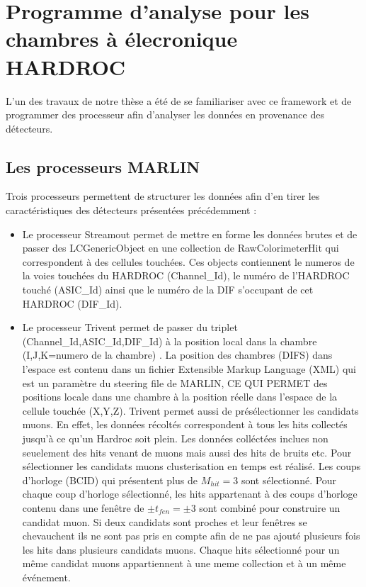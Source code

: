\section{Programme d'analyse pour les chambres à élecronique HARDROC}
L'un des travaux de notre thèse a été de se familiariser avec ce framework et de programmer des processeur afin d'analyser les données en provenance des détecteurs. 

\subsection{Les processeurs MARLIN}
Trois processeurs permettent de structurer les données afin d'en tirer les caractéristiques des détecteurs présentées précédemment :

\begin{itemize}[label=$\bullet$]
	\item Le processeur Streamout permet de mettre en forme les données brutes et de passer des LCGenericObject en une collection de RawColorimeterHit qui correspondent à des cellules touchées. Ces objects contiennent le numeros de la voies touchées du HARDROC (Channel\_Id), le numéro de l'HARDROC touché (ASIC\_Id) ainsi que le numéro de la DIF s'occupant de cet HARDROC (DIF\_Id).
	\item Le processeur Trivent permet de passer du triplet (Channel\_Id,ASIC\_Id,DIF\_Id) à la position local dans la chambre (I,J,K=numero de la chambre) . La position des chambres (DIFS) dans l'espace est contenu dans un fichier Extensible Markup Language (XML) qui est un paramètre du steering file de MARLIN, CE QUI PERMET des positions locale dans une chambre à la position réelle dans l'espace de la cellule touchée (X,Y,Z). Trivent permet aussi de présélectionner les candidats muons. En effet, les données récoltés correspondent à tous les hits collectés jusqu'à ce qu'un Hardroc soit plein. Les données colléctées inclues non seuelement des hits venant de muons mais aussi des hits de bruits etc. Pour sélectionner les candidats muons clusterisation en temps est réalisé. Les coups d'horloge (BCID) qui présentent plus de $M_{hit}=3$ sont sélectionné. Pour chaque coup d'horloge sélectionné, les hits appartenant à des coups d'horloge contenu dans une fenêtre de $\pm t_{fen}=\pm3$ sont combiné pour construire un candidat muon. Si deux candidats sont proches et leur fenêtres se chevauchent ils ne sont pas pris en compte afin de ne pas ajouté plusieurs fois les hits dans plusieurs candidats muons. Chaque hits sélectionné pour un même candidat muons appartiennent à une meme collection et à un même événement.

\end{itemize}

